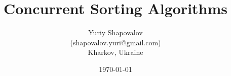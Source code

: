 
\pagestyle{empty}

\setlength{\textheight}{8.75in}
\setlength{\columnsep}{2.0pc}
\setlength{\textwidth}{6.8in}
\setlength{\footheight}{0.0in}
\setlength{\topmargin}{0.25in}
\setlength{\headheight}{0.0in}
\setlength{\headsep}{0.0in}
\setlength{\oddsidemargin}{-.19in}
\setlength{\parindent}{1pc}

\makeatletter
\def\@normalsize{\@setsize\normalsize{12pt}\xpt\@xpt
\abovedisplayskip 10pt plus2pt minus5pt\belowdisplayskip \abovedisplayskip
\abovedisplay\texttt{s}hortskip \z@ plus3pt\belowdisplayshortskip 6pt plus3pt
minus3pt\let\@listi\@listI} 

\def\subsize{\@setsize\subsize{12pt}\xipt\@xipt}

\def\section{\@startsection {section}{1}{\z@}{24pt plus 2pt minus 2pt}
{12pt plus 2pt minus 2pt}{\large\bf}}

\def\subsection{\@startsection {subsection}{2}{\z@}{12pt plus 2pt minus 2pt}
{12pt plus 2pt minus 2pt}{\subsize\bf}}
\makeatother



\date{\today}

\title{\Large\bf Concurrent Sorting Algorithms}

\author{Yuriy Shapovalov \\
  (shapovalov.yuri@gmail.com) \\
  Kharkov, Ukraine}
 

